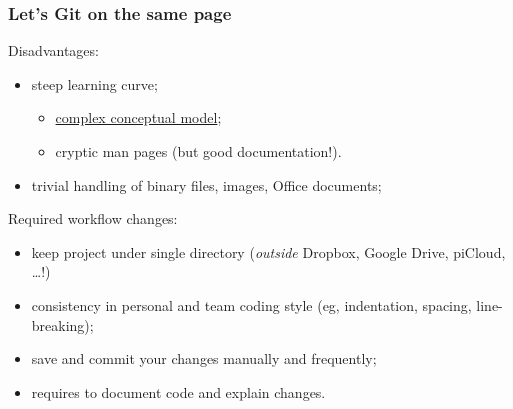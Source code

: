 \documentclass[10pt,svgnames]{beamer}
\begin{document}
\begin{frame}
\frametitle{Let's Git on the same page}
\label{git_cons}

Disadvantages:
\begin{itemize}
  \item steep learning curve;
  \begin{itemize}
      \item \hyperlink{xkcd_git}{complex conceptual model};
      \item cryptic man pages (but good documentation!).
  \end{itemize}  
  \item trivial handling of binary files, images, Office documents;
\end{itemize}

\medskip

Required workflow changes:
\begin{itemize}
  \item keep project under single directory (\emph{outside} Dropbox, Google Drive, piCloud, \ldots!)
  \item consistency in personal and team coding style (eg, indentation, spacing, line-breaking);
  \item save and commit your changes manually and frequently;
  \item requires to document code and explain changes.
\end{itemize}
\end{frame}
\end{document}
